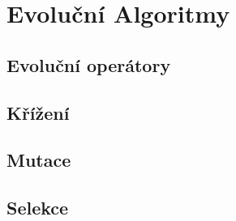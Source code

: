 \chapter{Evoluční Algoritmy}

\section{Evoluční operátory}
\section{Křížení}
\section{Mutace}
\section{Selekce}
